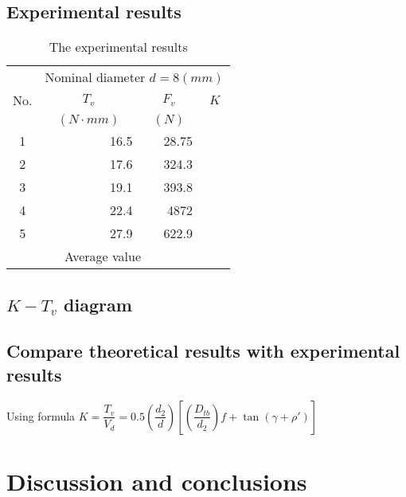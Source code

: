 \subsection{Experimental results}
\begin{table}[ht]
	\centering
	\renewcommand{\arraystretch}{1.5}
	\begin{tabular}{crrr}
		\toprule
		&
		\multicolumn{3}{c}{Nominal diameter $d=8\unit{(mm)}$} \\ \cmidrule{2-4} 
		\multirow{-2}{*}{No.} &
		\multicolumn{1}{c}{$T_v$} &
		\multicolumn{1}{c}{$F_v$} &
		\multicolumn{1}{c}{$K$} \\
		& \multicolumn{1}{c}{$ \unit{(N\cdot mm)} $} & \multicolumn{1}{c}{$ \unit{(N)} $} & \\
		\midrule
		1                   &  16.5                 &       28.75            &  \\
		2                  &     17.6              &       324.3             &  \\
		3                   &      19.1             &         393.8          &  \\
		4                   &   22.4                &      4872             &  \\
		5                   &   27.9                &        622.9           &  \\
		\multicolumn{3}{|c|}{\cellcolor[HTML]{C0C0C0}Average value} &  \\ \hline
	\end{tabular}
	\caption{The experimental results}
	\label{tab:my-table}
\end{table}
\subsection{$ K - T_v$ diagram }
\subsection{Compare theoretical results with experimental results}
Using formula $ K = \dfrac{T_v}{V_d} = 0.5\left(\dfrac{d_2}{d}\right)\left[\left(\dfrac{D_{tb}}{d_2}\right)f + \tan(\gamma+\rho')\right]$

\section{Discussion and conclusions}
